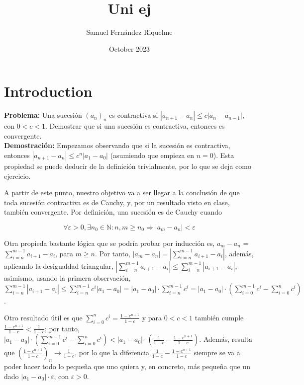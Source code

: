 \documentclass{article}
\title{Uni ej}
\author{Samuel Fernández Riquelme}
\date{October 2023}
\begin{document}
\maketitle

\section{Introduction}

\textbf{Problema:} Una sucesión $(a_n)_n$ es contractiva si $|a_{n + 1} - a_n| \leq c|a_n - a_{n - 1}|$, con $0 < c < 1$. Demostrar que si una sucesión es contractiva, entonces es convergente. \\

\textbf{Demostración:} Empezamos observando que si la sucesión es contractiva, entonces $|a_{n + 1} - a_n| \leq c^{n}|a_1 - a_0|$ (asumiendo que empieza en $n = 0$). Esta propiedad se puede deducir de la definición trivialmente, por lo que se deja como ejercicio.

A partir de este punto, nuestro objetivo va a ser llegar a la conclusión de que toda sucesión contractiva es de Cauchy, y, por un resultado visto en clase, también convergente. Por definición, una sucesión es de Cauchy cuando 

\[\forall\varepsilon > 0, \exists n_0 \in \mathbb{N}: n,m \geq n_0 \Longrightarrow |a_m - a_n| < \varepsilon\]

Otra propieda bastante lógica que se podría probar por inducción es, $a_m - a_n$ = $\sum_{i = n}^{m - 1} a_{i + 1} - a_i$, para $m \geq n$. Por tanto, $|a_m - a_n| = |\sum_{i = n}^{m - 1} a_{i + 1} - a_i|$, además, aplicando la desigualdad triangular, $|\sum_{i = n}^{m - 1} a_{i + 1} - a_i| \leq \sum_{i = n}^{m - 1} |a_{i + 1} - a_i|$, asimismo, usando la primera observación, $\sum_{i = n}^{m - 1} |a_{i + 1} - a_i| \leq \sum_{i = n}^{m - 1} c^{i}|a_1 - a_0| = |a_1 - a_0|·\sum_{i = n}^{m - 1} c^{i} = |a_1 - a_0|·(\sum_{i = 0}^{m - 1} c^{i} - \sum_{i = 0}^{n} c^{i})$.

Otro resultado útil es que $\sum_{i = 0}^{n} c^{i} = \frac{1 - c^{n + 1}}{1 - c}$ y para $0 < c < 1$ también cumple $\frac{1 - c^{n + 1}}{1 - c} < \frac{1}{1 - c}$; por tanto, $|a_1 - a_0|·(\sum_{i = 0}^{m - 1} c^{i} - \sum_{i = 0}^{n} c^{i}) < |a_1 - a_0|·(\frac{1}{1 - c} - \frac{1 - c^{n + 1}}{1 - c})$. Además, resulta que $(\frac{1 - c^{n + 1}}{1 - c})_n \longrightarrow \frac{1}{1 - c}$, por lo que la diferencia $\frac{1}{1 - c} - \frac{1 - c^{n + 1}}{1 - c}$ siempre se va a poder hacer todo lo pequeña que uno quiera y, en concreto, más pequeña que un dado $|a_1 - a_0|·\varepsilon$, con $\varepsilon > 0$. 
\end{document}
